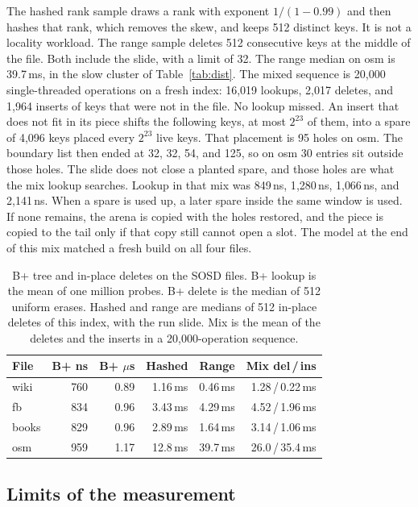 \documentclass[conference]{IEEEtran}
\begin{document}
The hashed rank sample draws a rank with exponent $1/(1-0.99)$ and then hashes that rank, which removes the skew, and keeps 512 distinct keys.
It is not a locality workload.
The range sample deletes 512 consecutive keys at the middle of the file.
Both include the slide, with a limit of 32.
The range median on osm is 39.7\,ms, in the slow cluster of Table~\ref{tab:dist}.
The mixed sequence is 20{,}000 single-threaded operations on a fresh index: 16{,}019 lookups, 2{,}017 deletes, and 1{,}964 inserts of keys that were not in the file.
No lookup missed.
An insert that does not fit in its piece shifts the following keys, at most $2^{23}$ of them, into a spare of 4{,}096 keys placed every $2^{23}$ live keys.
That placement is 95 holes on osm.
The boundary list then ended at 32, 32, 54, and 125, so on osm 30 entries sit outside those holes.
The slide does not close a planted spare, and those holes are what the mix lookup searches.
Lookup in that mix was 849\,ns, 1{,}280\,ns, 1{,}066\,ns, and 2{,}141\,ns.
When a spare is used up, a later spare inside the same window is used.
If none remains, the arena is copied with the holes restored, and the piece is copied to the tail only if that copy still cannot open a slot.
The model at the end of this mix matched a fresh build on all four files.

\begin{table}[t]
\caption{B+ tree and in-place deletes on the SOSD files.
B+ lookup is the mean of one million probes.
B+ delete is the median of 512 uniform erases.
Hashed and range are medians of 512 in-place deletes of this index, with the run slide.
Mix is the mean of the deletes and the inserts in a 20{,}000-operation sequence.}
\label{tab:base}
\centering
\footnotesize
\begin{tabular}{@{}lrrrrr@{}}
\toprule
File & B+ ns & B+ $\mu$s & Hashed & Range & Mix del\,/\,ins \\
\midrule
wiki  & 760 & 0.89 & 1.16\,ms & 0.46\,ms & 1.28\,/\,0.22\,ms \\
fb    & 834 & 0.96 & 3.43\,ms & 4.29\,ms & 4.52\,/\,1.96\,ms \\
books & 829 & 0.96 & 2.89\,ms & 1.64\,ms & 3.14\,/\,1.06\,ms \\
osm   & 959 & 1.17 & 12.8\,ms & 39.7\,ms & 26.0\,/\,35.4\,ms \\
\bottomrule
\end{tabular}
\end{table}

\subsection{Limits of the measurement}
\end{document}
